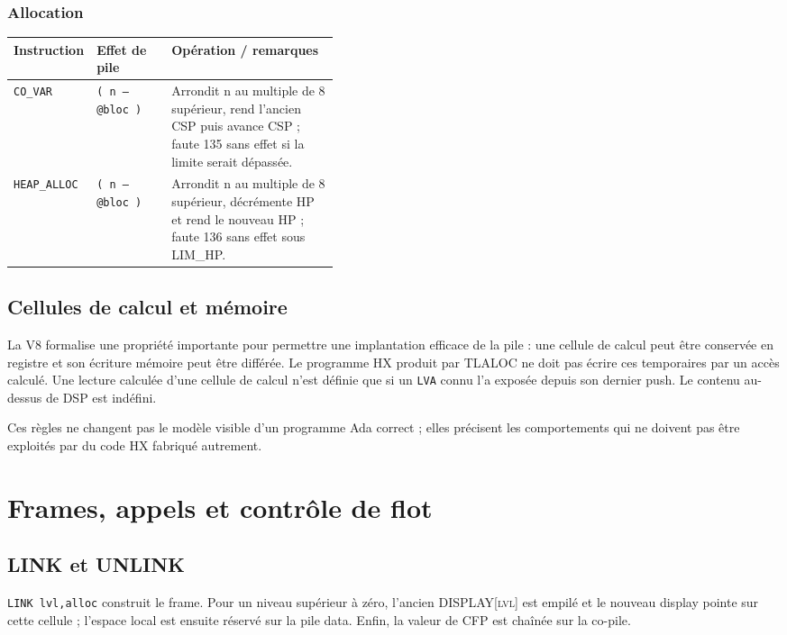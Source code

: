 \documentclass[10pt,a4paper,twoside,openany]{book}
\renewcommand{\arraystretch}{1.12}
\newcommand{\reg}[1]{\textsc{#1}}
\begin{document}
\subsection{Allocation}
\begin{center}
\renewcommand{\arraystretch}{1.16}
\begin{tabularx}{\linewidth}{@{}p{0.19\linewidth} p{0.23\linewidth} X@{}}
\toprule \textbf{Instruction} & \textbf{Effet de pile} & \textbf{Opération / remarques}\\ \midrule
\texttt{CO\_VAR} & \texttt{( n -- @bloc )} & Arrondit n au multiple de 8 supérieur, rend l'ancien CSP puis avance CSP ; faute 135 sans effet si la limite serait dépassée.\\
\texttt{HEAP\_ALLOC} & \texttt{( n -- @bloc )} & Arrondit n au multiple de 8 supérieur, décrémente HP et rend le nouveau HP ; faute 136 sans effet sous LIM\_HP.\\
\bottomrule
\end{tabularx}
\end{center}
\section{Cellules de calcul et mémoire}
La V8 formalise une propriété importante pour permettre une implantation efficace de la pile : une cellule de calcul peut être conservée en registre et son écriture mémoire peut être différée. Le programme HX produit par TLALOC ne doit pas écrire ces temporaires par un accès calculé. Une lecture calculée d'une cellule de calcul n'est définie que si un \texttt{LVA} connu l'a exposée depuis son dernier push. Le contenu au-dessus de \reg{DSP} est indéfini.

Ces règles ne changent pas le modèle visible d'un programme Ada correct ; elles précisent les comportements qui ne doivent pas être exploités par du code HX fabriqué autrement.

\chapter{Frames, appels et contrôle de flot}
\section{LINK et UNLINK}
\texttt{LINK lvl,alloc} construit le frame. Pour un niveau supérieur à zéro, l'ancien \reg{DISPLAY[lvl]} est empilé et le nouveau display pointe sur cette cellule ; l'espace local est ensuite réservé sur la pile data. Enfin, la valeur de \reg{CFP} est chaînée sur la co-pile.
\end{document}
